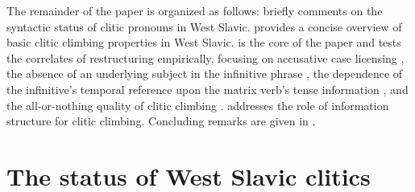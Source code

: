 \documentclass[output=paper,colorlinks,citecolor=brown]{langscibook}
\begin{document}
\ea\label{kul:ex:martina}
\label{kul:ex:martina-a}
\label{kul:ex:martina-b}
\z
\z

\noindent The remainder of the paper is organized as follows:  briefly comments on the syntactic status of clitic pronouns in West Slavic.  provides a concise overview of basic clitic climbing properties in West Slavic.  is the core of the paper and tests the correlates of restructuring empirically, focusing on accusative case licensing , the absence of an underlying subject in the infinitive phrase , the dependence of the infinitive’s temporal reference upon the matrix verb’s tense information , and the all-or-nothing quality of clitic climbing .  addresses the role of information structure for clitic climbing. Concluding remarks are given in .

\section{The status of West Slavic clitics}\label{kul:sec:status-clitics}
\end{document}
